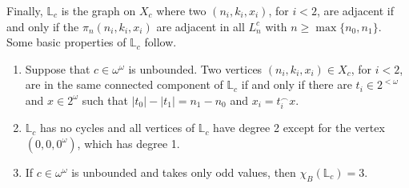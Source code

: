 Finally, $\mathbb L_c$ is the graph on $X_c$ where two $(n_i,k_i,x_i)$, for $i<2$, are adjacent if and only if the $\pi_n(n_i,k_i,x_i)$ are adjacent in all $L^c_n$ with $n\geq\max\{n_0,n_1\}$.
Some basic properties of $\mathbb L_c$ follow.

\begin{lemma}\label{lemma:L0_basics}
    \begin{enumerate}[label=(\alph*)]
        \item Suppose that $c\in\omega^\omega$ is unbounded. Two vertices $(n_i,k_i,x_i)\in X_c$, for $i<2$, are in the same connected component of $\mathbb L_c$ if and only if there are $t_i\in2^{<\omega}$ and $x\in2^\omega$ such that $|t_0|-|t_1|=n_1-n_0$ and $x_i=t_i^\smallfrown x$.
        
        \item $\mathbb L_c$ has no cycles and all vertices of $\mathbb L_c$ have degree 2 except for the vertex $(0,0,0^\omega)$, which has degree 1.
        
        \item If $c\in\omega^\omega$ is unbounded and takes only odd values, then $\chi_B(\mathbb L_c)=3$.
    \end{enumerate}
\end{lemma}

